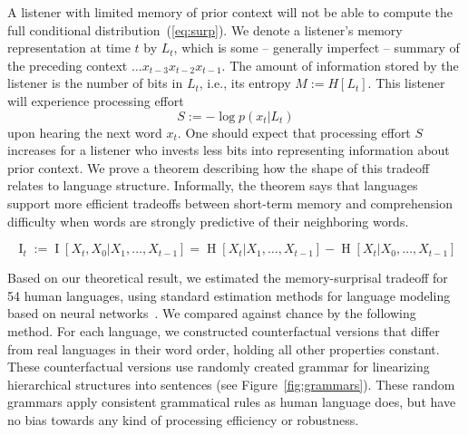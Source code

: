 \documentclass[11pt,letterpaper]{article}
\newcounter{theorem}
\begin{document}
A listener with limited memory of prior context will not be able to compute the full conditional distribution~(\ref{eq:surp}).
We denote a listener's memory representation at time $t$ by $L_t$, which is some -- generally imperfect -- summary of the preceding context $\dots x_{t-3}x_{t-2}x_{t-1}$.
The amount of information stored by the listener is the number of bits in $L_t$, i.e., its entropy $M := H[L_t]$.
This listener will experience processing effort
\begin{equation}
	S :=	-\log p(x_t|L_t)
\end{equation}
upon hearing the next word $x_t$.
One should expect that processing effort $S$ increases for a listener who invests less bits into representing information about prior context.
We prove a theorem describing how the shape of this tradeoff relates to language structure. %
Informally, the theorem says that languages support more efficient tradeoffs between short-term memory and comprehension difficulty when words are strongly predictive of their neighboring words.


\begin{equation}
	\operatorname{I}_t := \operatorname{I}[X_t, X_0 | X_1, \dots, X_{t-1}] = \operatorname{H}[X_t|X_1, \dots, X_{t-1}] - \operatorname{H}[X_t|X_0, \dots, X_{t-1}] 
\end{equation}



%
%




Based on our theoretical result, we estimated the memory-surprisal tradeoff for 54 human languages, using standard estimation methods for language modeling based on neural networks~\citep{hochreiter-long-1997}.
We compared against chance by the following method.
For each language, we constructed counterfactual versions that differ from real languages in their word order, holding all other properties constant.
These counterfactual versions use randomly created grammar for linearizing hierarchical structures into sentences (see Figure~\ref{fig:grammars}).
These random grammars apply consistent grammatical rules as human language does, but have no bias towards any kind of processing efficiency or robustness.
\end{document}
